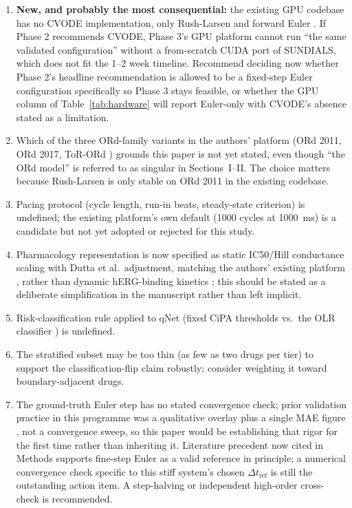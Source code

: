 \documentclass[journal]{IEEEtran}
\begin{document}
\begin{enumerate}
\item \textbf{New, and probably the most consequential:} the existing GPU codebase has no CVODE implementation, only Rush-Larsen and forward Euler \cite{pramawijaya2024thesis}. If Phase 2 recommends CVODE, Phase 3's GPU platform cannot run ``the same validated configuration'' without a from-scratch CUDA port of SUNDIALS, which does not fit the 1--2 week timeline. Recommend deciding now whether Phase 2's headline recommendation is allowed to be a fixed-step Euler configuration specifically so Phase 3 stays feasible, or whether the GPU column of Table~\ref{tab:hardware} will report Euler-only with CVODE's absence stated as a limitation.
\item Which of the three ORd-family variants in the authors' platform (ORd 2011, ORd 2017, ToR-ORd \cite{pramawijaya2024thesis}) grounds this paper is not yet stated, even though ``the ORd model'' is referred to as singular in Sections~I--II. The choice matters because Rush-Larsen is only stable on ORd 2011 in the existing codebase.
\item Pacing protocol (cycle length, run-in beats, steady-state criterion) is undefined; the existing platform's own default (1000 cycles at 1000~ms) is a candidate but not yet adopted or rejected for this study.
\item Pharmacology representation is now specified as static IC50/Hill conductance scaling with Dutta et al.\ adjustment, matching the authors' existing platform \cite{pramawijaya2024thesis}, rather than dynamic hERG-binding kinetics \cite{li2017}; this should be stated as a deliberate simplification in the manuscript rather than left implicit.
\item Risk-classification rule applied to qNet (fixed CiPA thresholds vs.\ the OLR classifier \cite{kamanditya2024}) is undefined.
\item The stratified subset may be too thin (as few as two drugs per tier) to support the classification-flip claim robustly; consider weighting it toward boundary-adjacent drugs.
\item The ground-truth Euler step has no stated convergence check; prior validation practice in this programme was a qualitative overlay plus a single MAE figure \cite{pramawijaya2024thesis}, not a convergence sweep, so this paper would be establishing that rigor for the first time rather than inheriting it. Literature precedent now cited in Methods \cite{eulerprecision2013} supports fine-step Euler as a valid reference in principle; a numerical convergence check specific to this stiff system's chosen $\Delta t_{\text{ref}}$ is still the outstanding action item. A step-halving or independent high-order cross-check is recommended.

\end{enumerate}
\end{document}
